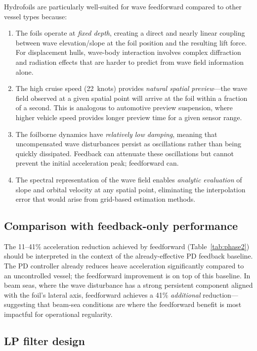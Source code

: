 \documentclass[review]{elsarticle}
\begin{document}
Hydrofoils are particularly well-suited for wave feedforward
compared to other vessel types because:
\begin{enumerate}
  \item The foils operate at \emph{fixed depth}, creating a direct and
    nearly linear coupling between wave elevation/slope at the foil
    position and the resulting lift force.
    For displacement hulls, wave-body interaction involves complex
    diffraction and radiation effects that are harder to predict from
    wave field information alone.
  \item The high cruise speed (22~knots) provides \emph{natural spatial
    preview}---the wave field observed at a given spatial point will
    arrive at the foil within a fraction of a second.
    This is analogous to automotive preview suspension, where higher
    vehicle speed provides longer preview time for a given sensor range.
  \item The foilborne dynamics have \emph{relatively low damping},
    meaning that uncompensated wave disturbances persist as oscillations
    rather than being quickly dissipated.
    Feedback can attenuate these oscillations but cannot prevent the
    initial acceleration peak; feedforward can.
  \item The spectral representation of the wave field enables
    \emph{analytic evaluation} of slope and orbital velocity at any
    spatial point, eliminating the interpolation error that would
    arise from grid-based estimation methods.
\end{enumerate}

\subsection{Comparison with feedback-only performance}

The 11--41\% acceleration reduction achieved by feedforward
(Table~\ref{tab:phase2}) should be interpreted in the context of
the already-effective PD feedback baseline.
The PD controller already reduces heave acceleration significantly
compared to an uncontrolled vessel; the feedforward improvement
is on top of this baseline.
In beam seas, where the wave disturbance has a strong persistent
component aligned with the foil's lateral axis, feedforward achieves
a 41\% \emph{additional} reduction---suggesting that beam-sea
conditions are where the feedforward benefit is most impactful for
operational regularity.

\subsection{LP filter design}
\end{document}
